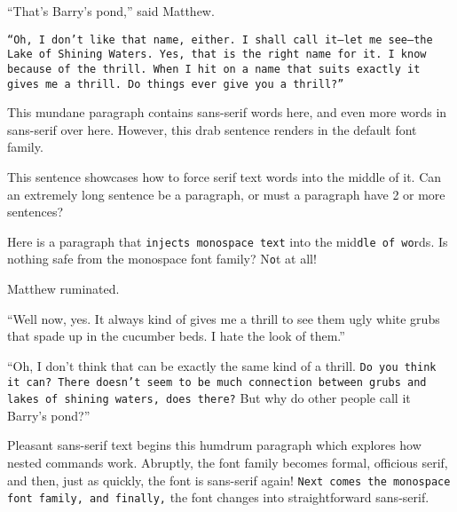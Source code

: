 \documentclass[a4paper]{article}
\begin{document}
\textrm{``That's Barry's pond,'' said Matthew.}

\texttt{``Oh, I don't like that name, either. I shall call it---let me see---the Lake of Shining Waters. Yes, that is the right name for it. I know because of the thrill. When I hit on a name that suits exactly it gives me a thrill. Do things ever give you a thrill?''}

This mundane paragraph contains \textsf{sans-serif} words here, and even more \textsf{words in sans-serif over here}. However, this drab sentence renders in the default font family.

This sentence showcases \textrm{how to force serif text words} into the middle of it. Can an extremely long sentence be a paragraph, or must a paragraph have 2 or more sentences?

Here is a paragraph that \texttt{injects monospace text} into the mid\texttt{dle of wo}rds. Is nothing safe from the monospace font family? N\texttt{o}t at all!

Matthew \textsf{ruminated.}

``Well now, yes. \textrm{It always kind of gives me a thrill to see them ugly white grubs that spade up in the cucumber beds.} I hate the look of them.''

``Oh, I don't think that can be exactly the same kind of a thrill. \texttt{Do you think it can? There doesn't seem to be much connection between grubs and lakes of shining waters, does there?} But why do other people call it Barry's pond?''

\textsf{Pleasant sans-serif text begins this humdrum paragraph which explores how nested commands work. \textrm{Abruptly, the font family becomes formal, officious serif,} and then, just as quickly, the font is sans-serif again! \texttt{Next comes the monospace font family, and finally,} the font changes into straightforward sans-serif.}
\end{document}

